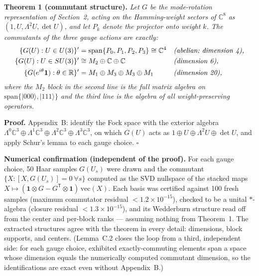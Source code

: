 \documentclass[11pt]{article}
\newcommand{\CC}{\mathbb{C}}
\newcommand{\RR}{\mathbb{R}}
\begin{document}
\medskip

\noindent\textbf{Theorem 1 (commutant structure).} \emph{Let $G$ be the mode-rotation representation of Section~2, acting on the Hamming-weight sectors of $\CC^8$ as $(1, U, \Lambda^2 U, \det U)$, and let $P_k$ denote the projector onto weight $k$. The commutants of the three gauge actions are exactly:}
\begin{align*}
\{G(U) : U \in U(3)\}' &= \mathrm{span}\{P_0, P_1, P_2, P_3\} \cong \CC^4 && \text{\emph{(abelian; dimension 4),}}\\
\{G(U) : U \in SU(3)\}' &\cong M_2 \oplus \CC \oplus \CC && \text{\emph{(dimension 6),}}\\
\{G(e^{i\theta}\mathbf{1}) : \theta \in \RR\}' &= M_1 \oplus M_3 \oplus M_3 \oplus M_1 && \text{\emph{(dimension 20),}}
\end{align*}
\emph{where the $M_2$ block in the second line is the full matrix algebra on $\mathrm{span}\{|000\rangle, |111\rangle\}$ and the third line is the algebra of all weight-preserving operators.}

\textbf{Proof.} Appendix~B: identify the Fock space with the exterior algebra $\Lambda^0\CC^3 \oplus \Lambda^1\CC^3 \oplus \Lambda^2\CC^3 \oplus \Lambda^3\CC^3$, on which $G(U)$ acts as $1 \oplus U \oplus \Lambda^2 U \oplus \det U$, and apply Schur's lemma to each gauge choice. \hfill$\square$

\medskip

\textbf{Numerical confirmation (independent of the proof).} For each gauge choice, 50 Haar samples $G(U_s)$ were drawn and the commutant $\{X : [X, G(U_s)] = 0\ \forall s\}$ computed as the SVD nullspace of the stacked maps $X \mapsto (\mathbf{1} \otimes G - G^{\mathsf{T}} \otimes \mathbf{1})\,\mathrm{vec}(X)$. Each basis was certified against 100 fresh samples (maximum commutator residual $< 1.2 \times 10^{-15}$), checked to be a unital $*$-algebra (closure residual $< 1.3 \times 10^{-15}$), and its Wedderburn structure read off from the center and per-block ranks --- assuming nothing from Theorem~1. The extracted structures agree with the theorem in every detail: dimensions, block supports, and centers. (Lemma~C.2 closes the loop from a third, independent side: for each gauge choice, exhibited exactly-commuting elements span a space whose dimension equals the numerically computed commutant dimension, so the identifications are exact even without Appendix~B.)
\end{document}
